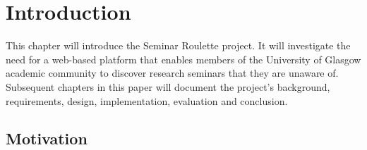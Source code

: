 \documentclass{l4proj}
\begin{document}
\tableofcontents

%
%
%
%
%
%
%
%
\chapter{Introduction}


This chapter will introduce the Seminar Roulette project. It will investigate the need for a web-based platform that enables members of the University of Glasgow academic community to discover research seminars that they are unaware of. Subsequent chapters in this paper will document the project's background, requirements, design, implementation, evaluation and conclusion.

\section{Motivation}
\label{section:motivation}
\end{document}
